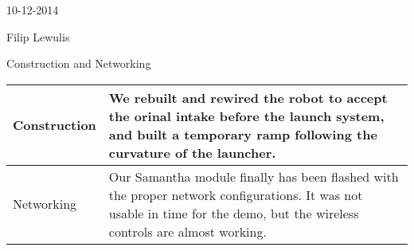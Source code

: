 10-12-2014

Filip Lewulis

Construction and Networking

\begin{tabular}{|p{5cm}|p{5cm}|}
\hline Construction &
We rebuilt and rewired the robot to accept the orinal intake before the launch system,
and built a temporary ramp following the curvature of the launcher. \\
\hline Networking &
Our Samantha module finally has been flashed with the proper network configurations. It
was not usable in time for the demo, but the wireless controls are almost working. \\
\hline
\end{tabular}